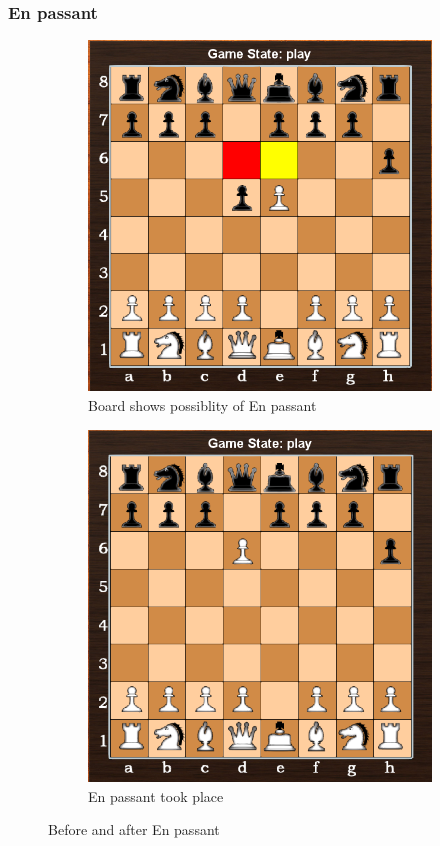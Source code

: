 \documentclass[11pt,a4paper]{article}
\begin{document}
\subsubsection{En passant}
\begin{figure}[H]
\centering
\begin{subfigure}{0.5\textwidth}
  \centering
  \includegraphics[width=0.91\linewidth]{Enpassant1}
  \caption{Board shows possiblity of En passant}
  \label{fig:sub1}
\end{subfigure}%
\begin{subfigure}{0.5\textwidth}
  \centering
  \includegraphics[width=0.9\linewidth]{Enpassant2}
  \caption{En passant took place}
  \label{fig:sub2}
\end{subfigure}
\caption{Before and after En passant}
\label{fig:test}
\end{figure}
\end{document}
